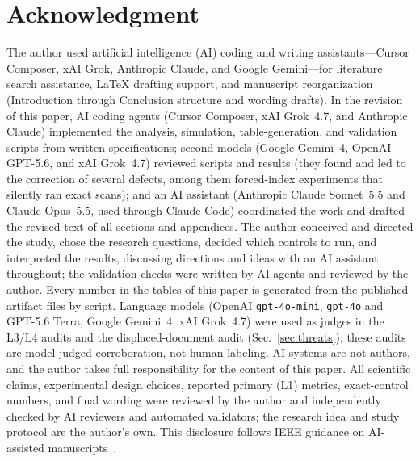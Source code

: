 \documentclass{ieeeaccess}
\makeatletter
\DeclareRobustCommand{\_}{\ifmmode\nfss@text{\textunderscore}\else\textunderscore\allowbreak\fi}
\makeatother
\begin{document}
\section*{Acknowledgment}
The author used artificial intelligence (AI) coding and writing assistants---Cursor Composer, xAI Grok, Anthropic Claude, and Google Gemini---for literature search assistance, LaTeX drafting support, and manuscript reorganization (Introduction through Conclusion structure and wording drafts). In the revision of this paper, AI coding agents (Cursor Composer, xAI Grok~4.7, and Anthropic Claude) implemented the analysis, simulation, table-generation, and validation scripts from written specifications; second models (Google Gemini~4, OpenAI GPT-5.6, and xAI Grok~4.7) reviewed scripts and results (they found and led to the correction of several defects, among them forced-index experiments that silently ran exact scans); and an AI assistant (Anthropic Claude Sonnet~5.5 and Claude Opus~5.5, used through Claude Code) coordinated the work and drafted the revised text of all sections and appendices. The author conceived and directed the study, chose the research questions, decided which controls to run, and interpreted the results, discussing directions and ideas with an AI assistant throughout; the validation checks were written by AI agents and reviewed by the author. Every number in the tables of this paper is generated from the published artifact files by script.
Language models (OpenAI \texttt{gpt-4o-mini}, \texttt{gpt-4o} and GPT-5.6 Terra, Google Gemini~4, xAI Grok~4.7) were used as judges in the L3/L4 audits and the displaced-document audit (Sec.~\ref{sec:threats}); these audits are model-judged corroboration, not human labeling.
AI systems are not authors, and the author takes full responsibility for the content of this paper. All scientific claims, experimental design choices, reported primary (L1) metrics, exact-control numbers, and final wording were reviewed by the author and independently checked by AI reviewers and automated validators; the research idea and study protocol are the author's own.
This disclosure follows IEEE guidance on AI-assisted manuscripts~\cite{ieee2024aipolicy}.
\end{document}
